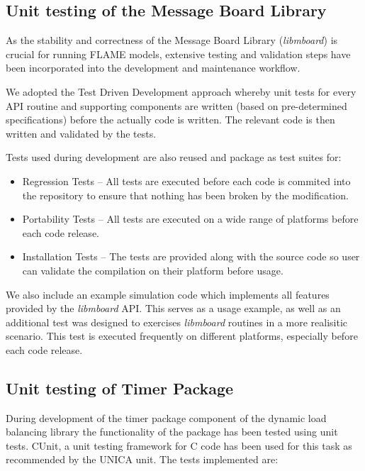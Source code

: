 \subsection{Unit testing of the Message Board Library}

As the stability and correctness of the Message Board Library (\textit{libmboard}) is crucial for running FLAME models, extensive testing and validation steps have been incorporated into the development and maintenance workflow. 

We adopted the Test Driven Development approach whereby unit tests for every API routine and supporting components are written (based on pre-determined specifications) before the actually code is written. The relevant code is then written and validated by the tests. 

Tests used during development are also reused and package as test suites for:
\begin{itemize}
\item Regression Tests -- All tests are executed before each code is commited into the repository to ensure that nothing has been broken by the modification.
\item Portability Tests -- All tests are executed on a wide range of platforms before each code release.
\item Installation Tests -- The tests are provided along with the source code so user can validate the compilation on their platform before usage.
\end{itemize}

We also include an example simulation code which implements all features provided by the \textit{libmboard} API. This serves as a usage example, as well as an additional test was designed to exercises \textit{libmboard} routines in a more realisitic scenario. This test is executed frequently on different platforms, especially before each code release.

\subsection{Unit testing of Timer Package}

During development of the timer package component of the dynamic load balancing library the functionality of the package has been tested using unit tests. CUnit, a unit testing framework for C code has been used for this task as recommended by the UNICA unit. The tests implemented are:

